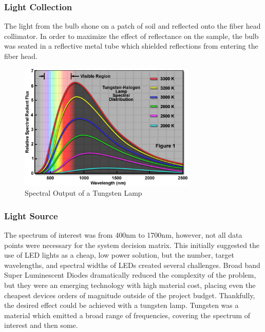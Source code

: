 \subsubsection{Light Collection} The light from the bulb shone on a patch of soil and reflected onto the fiber head collimator. In order to maximize the effect of reflectance on the sample, the bulb was seated in a reflective metal tube which shielded reflections from entering the fiber head.

\begin{figure}[H]
    \caption{Spectral Output of a Tungsten Lamp}
    \centering
    \includegraphics[width=0.75\textwidth]{images/TungstenLamp.jpg}
\end{figure}

\subsubsection{Light Source} The spectrum of interest was from 400nm to 1700nm, however, not all data points were necessary for the system decision matrix. This initially suggested the use of LED lights as a cheap, low power solution, but the number, target wavelengths, and spectral widths of LEDs created several challenges. Broad band Super Luminescent Diodes dramatically reduced the complexity of the problem, but they were an emerging technology with high material cost, placing even the cheapest devices orders of magnitude outside of the project budget. Thankfully, the desired effect could be achieved with a tungsten lamp. Tungsten was a material which emitted a broad range of frequencies, covering the spectrum of interest and then some.
